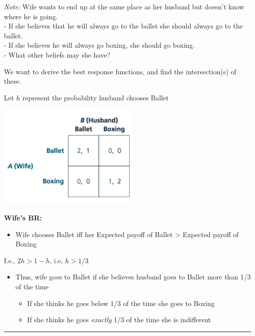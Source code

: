 \documentclass[]{article}
\providecommand{\tightlist}{%
  \setlength{\itemsep}{0pt}\setlength{\parskip}{0pt}}
\begin{document}
\emph{Note:} Wife wants to end up at the same place as her husband but doesn't know where he is going.\\
- If she believes that he will always go to the ballet she should always go to the ballet.\\
- If she believes he will always go boxing, she should go boxing.\\
- What other beliefs may she have?

We want to derive the best response functions, and find the intersection(s) of these.

Let \(h\) represent the probability husband chooses Ballet

\includegraphics[height=2.0in]{picsfigs/bosmatrix.png}

\textbf{Wife's BR:}

\begin{itemize}
\tightlist
\item
  Wife chooses Ballet iff her Expected payoff of Ballet \textgreater{} Expected payoff of Boxing
\end{itemize}

\bigskip

I.e., \(2h > 1- h\), i.e, \(h > 1/3\)

\begin{itemize}
\tightlist
\item
  Thus, wife goes to Ballet if she believes husband goes to Ballet more than 1/3 of the time

  \begin{itemize}
  \tightlist
  \item
    If she thinks he goes below 1/3 of the time she goes to Boxing
  \item
    If she thinks he goes \emph{exactly} 1/3 of the time she is indifferent
  \end{itemize}
\end{itemize}

\begin{center}\rule{0.5\linewidth}{\linethickness}\end{center}
\end{document}
